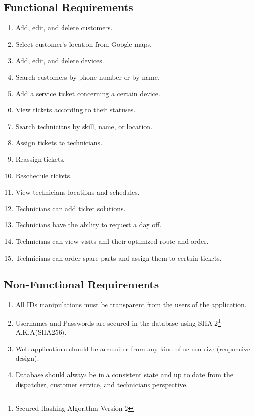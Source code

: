 \subsection{Functional Requirements}
	\begin{enumerate}
		\item Add, edit, and delete customers.
		\item Select customer's location from Google maps.
		\item Add, edit, and delete devices.
		\item Search customers by phone number or by name.
		\item Add a service ticket concerning a certain device.
		\item View tickets according to their statuses.
		\item Search technicians by skill, name, or location.
		\item Assign tickets to technicians.
		\item Reassign tickets.
		\item Reschedule tickets.
		\item View technicians locations and schedules.
		\item Technicians can add ticket solutions.
		\item Technicians have the ability to request a day off.
		\item Technicians can view visits and their optimized route and order.
		\item Technicians can order spare parts and assign them to certain tickets.
	\end{enumerate}
\subsection{Non-Functional Requirements}
	\begin{enumerate}
		\item All IDs manipulations must be transparent from the users of the application.
		\item Usernames and Passwords are secured in the database using SHA-2\footnote{Secured Hashing Algorithm Version 2} A.K.A(SHA256).
		\item Web applications should be accessible from any kind of screen size (responsive design).
		\item Database should always be in a consistent state and up to date from the dispatcher, customer service, and technicians perspective.
	\end{enumerate}